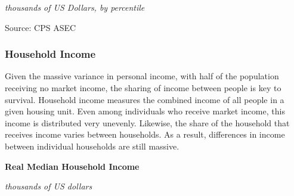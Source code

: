 \documentclass{report}
\newcommand{\tbllink}[1]{\href{https://raw.githubusercontent.com/bdecon/US-chartbook/master/chartbook/data/#1}{\faTable}}
\begin{document}
{{{\begin{minipage}{0.76\textwidth}
\footnotesize{\textit{thousands of US Dollars, by percentile}}


\footnotesize{Source: CPS ASEC} \hspace{39mm} \tbllink{pearn_dist.csv}
\end{minipage}

\newpage 

\subsubsection*{\color{black!70} \seriffont Household Income}

\begin{minipage}{0.76\textwidth} 
\small Given the massive variance in personal income, with half of the population receiving no market income, the sharing of income between people is key to survival. Household income measures the combined income of all people in a given housing unit. Even among individuals who receive market income, this income is distributed very unevenly. Likewise, the share of the household that receives income varies between households. As a result, differences in income between individual households are still massive. 

\end{minipage}

\vspace{1mm}

\begin{minipage}{0.37\textwidth}
\normalsize \textbf{Real Median Household Income}

\footnotesize{\textit{thousands of US dollars}}


\end{minipage}}}}
\end{document}
